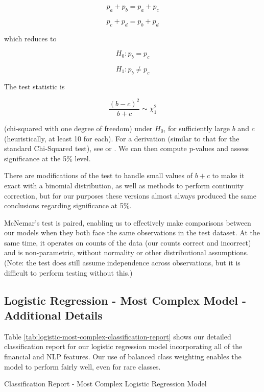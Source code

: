 \documentclass{article}[11pt]
\begin{document}
    \[
    p_{a}+p_{b}=p_{a}+p_{c}
    \]

    \[
    p_{c}+p_{d}=p_{b}+p_{d}
    \]

    which reduces to

    \[
    H_{0}:p_{b}=p_{c}
    \]

    \[
    H_{1}:p_{b}\neq p_{c}
    \]

    The test statistic is

    \[
    \frac{(b-c)^{2}}{b+c}\sim\chi_{1}^{2}
    \]

    (chi-squared with one degree of freedom) under $H_{0}$, for sufficiently large $b$ and $c$ (heuristically, at least 10 for each). For a derivation (similar to that for the standard Chi-Squared test), see \cite{mcnemar_note_1947} or \cite{rice_mathematical_2006}. We can then compute p-values and assess significance at the 5\% level.

    There are modifications of the test to handle small values of $b+c$ to make it exact with a binomial distribution, as well as methods to perform continuity correction, but for our purposes these versions almost always produced the same conclusions regarding significance at 5\%.

    McNemar's test is paired, enabling us to effectively make comparisons between our models when they both face the same observations in the test dataset. At the same time, it operates on counts of the data (our counts correct and incorrect) and is non-parametric, without normality or other distributional assumptions. (Note: the test does still assume independence across observations, but it is difficult to perform testing without this.)

    \clearpage
    \newpage
    \subsection{Logistic Regression - Most Complex Model - Additional Details}

    \label{sec:logistic-most-complex-model-additional-details}

    Table \ref{tab:logistic-most-complex-classification-report} shows our detailed classification report for our logistic regression model incorporating all of the financial and NLP features. Our use of balanced class weighting enables the model to perform fairly well, even for rare classes.

    \begin{table}[h!]
        \centering
        \caption{Classification Report - Most Complex Logistic Regression Model}
        
        \label{tab:logistic-most-complex-classification-report}
    \end{table}
\end{document}
